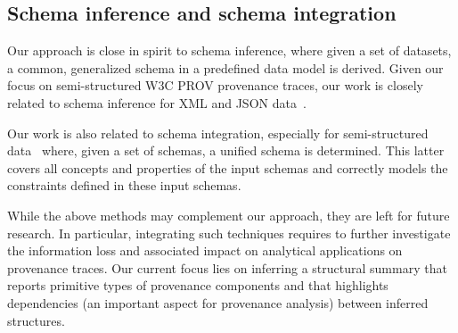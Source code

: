 
\subsection{Schema inference and schema integration}
Our approach is close in spirit to schema inference, where given a set of datasets, a common, generalized schema in a predefined data model is derived. Given our focus on semi-structured W3C PROV provenance traces, our work is closely related to schema inference for XML and JSON data~\cite{hegewald:icdews06,baazizi2017}.

Our work is also related to schema integration, especially for semi-structured data~\cite{chiticariu:sigmod08}  where, given a set of schemas, a unified schema is determined. This latter covers all concepts and properties of the input schemas and correctly models the constraints defined in these input schemas.  

While the above methods may complement our approach, they are left for future research. In particular, integrating such techniques requires to further investigate the information loss and associated impact on analytical applications on provenance traces.
Our current focus lies on inferring a structural summary that reports primitive types of provenance components and that highlights dependencies (an important aspect for provenance analysis) between inferred structures. 



